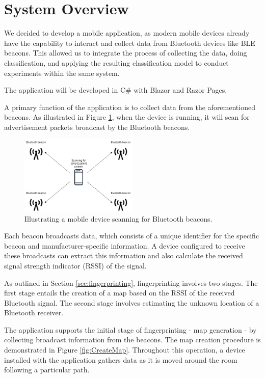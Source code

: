 \section{System Overview}\label{sec:system_overview}

We decided to develop a mobile application, as modern mobile devices already have the capability to interact and collect data from Bluetooth devices like BLE beacons. 
This allowed us to integrate the process of collecting the data, doing classification, and applying the resulting classification model to conduct experiments within the same system.

The application will be developed in C\#\cite{billwagnerDocsGetStarted} with Blazor\cite{BlazorBuildClient} and Razor Pages\cite{tdykstraIntroductionRazorPages2023}.

A primary function of the application is to collect data from the aforementioned beacons. 
As illustrated in Figure \ref{fig:ScanAdvertisement}, when the device is running, it will scan for advertisement packets broadcast by the Bluetooth beacons.

\begin{figure}[H]
    \centering
    \includegraphics[width=0.5\textwidth]{images/ScanningForAdvertisement.drawio.png}
    \caption{Illustrating a mobile device scanning for Bluetooth beacons.}
    \label{fig:ScanAdvertisement}
\end{figure}

Each beacon broadcasts data, which consists of a unique identifier for the specific beacon and manufacturer-specific information.
A device configured to receive these broadcasts can extract this information and also calculate the received signal strength indicator (RSSI) of the signal.

As outlined in Section \ref{sec:fingerprinting}, fingerprinting involves two stages.
The first stage entails the creation of a map based on the RSSI of the received Bluetooth signal. The second stage involves estimating the unknown location of a Bluetooth receiver.

The application supports the initial stage of fingerprinting - map generation - by collecting broadcast information from the beacons. 
The map creation procedure is demonstrated in Figure \ref{fig:CreateMap}. 
Throughout this operation, a device installed with the application gathers data as it is moved around the room following a particular path.

